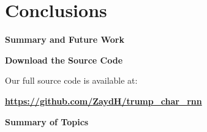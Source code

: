 \documentclass[10pt,aspectratio=169]{beamer}
\begin{document}
  \section{Conclusions}
  \begin{frame}{\textbf{Summary and Future Work}}
  
  \end{frame}

  \begin{frame}{\textbf{Download the Source Code}}
  
    Our full source code is available at:
    
    \begin{center}
      \href{https://github.com/ZaydH/trump_char_rnn}{\textbf{\color{ucscBlue} https://github.com/ZaydH/trump\_char\_rnn}}
    \end{center}
  
  \end{frame}


  \begin{frame}{\textbf{Summary of Topics}}{}
    \tableofcontents
  \end{frame}
	
\end{document}
